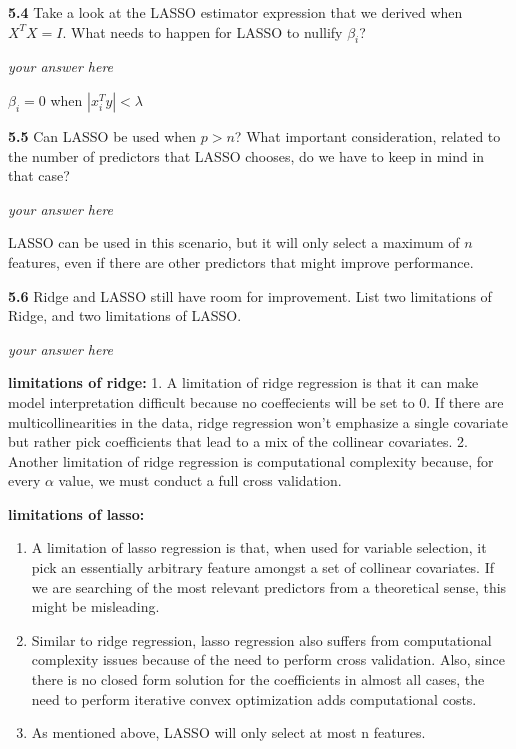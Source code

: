 \documentclass[11pt]{article}
\providecommand{\tightlist}{%
      \setlength{\itemsep}{0pt}\setlength{\parskip}{0pt}}
\begin{document}
    \textbf{5.4} Take a look at the LASSO estimator expression that we
derived when \(X^TX=I\). What needs to happen for LASSO to nullify
\(\beta_i\)?

    \emph{your answer here}

\(\beta_i = 0\) when \(|x_i^Ty| < \lambda\)

    \textbf{5.5} Can LASSO be used when \(p>n\)? What important
consideration, related to the number of predictors that LASSO chooses,
do we have to keep in mind in that case?

    \emph{your answer here}

LASSO can be used in this scenario, but it will only select a maximum of
\(n\) features, even if there are other predictors that might improve
performance.

    \textbf{5.6} Ridge and LASSO still have room for improvement. List two
limitations of Ridge, and two limitations of LASSO.

    \emph{your answer here}

\textbf{limitations of ridge:} 1. A limitation of ridge regression is
that it can make model interpretation difficult because no coeffecients
will be set to 0. If there are multicollinearities in the data, ridge
regression won't emphasize a single covariate but rather pick
coefficients that lead to a mix of the collinear covariates. 2. Another
limitation of ridge regression is computational complexity because, for
every \(\alpha\) value, we must conduct a full cross validation.

\textbf{limitations of lasso:}

\begin{enumerate}
\def\labelenumi{\arabic{enumi}.}
\tightlist
\item
  A limitation of lasso regression is that, when used for variable
  selection, it pick an essentially arbitrary feature amongst a set of
  collinear covariates. If we are searching of the most relevant
  predictors from a theoretical sense, this might be misleading.
\item
  Similar to ridge regression, lasso regression also suffers from
  computational complexity issues because of the need to perform cross
  validation. Also, since there is no closed form solution for the
  coefficients in almost all cases, the need to perform iterative convex
  optimization adds computational costs.
\item
  As mentioned above, LASSO will only select at most n features.
\end{enumerate}
\end{document}
